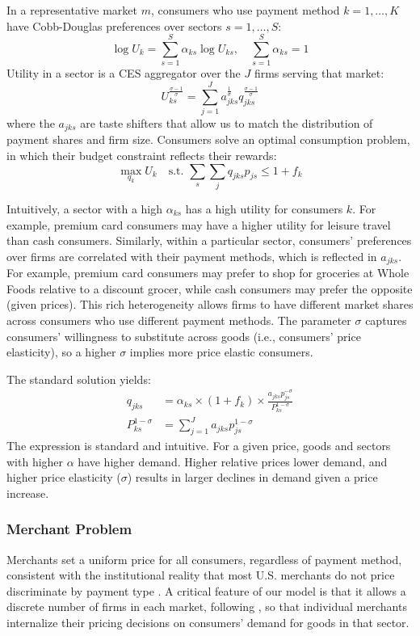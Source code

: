 \documentclass[11pt,english]{article}
\theoremstyle{remark}
\begin{document}
In a representative market $m$, consumers who use payment method $k=1,\dots,K$ have Cobb-Douglas preferences over sectors $s=1,\dots,S$:
\[
\log U_{k}=\sum_{s=1}^{S}\alpha_{ks}\log U_{ks},\quad\sum_{s=1}^{S}\alpha_{ks}=1
\]
Utility in a sector is a CES aggregator over the $J$ firms serving that market:
\[
U_{ks}^{\frac{\sigma-1}{\sigma}}=\sum_{j=1}^{J}a_{jks}^{\frac{1}{\sigma}}q_{jks}^{\frac{\sigma-1}{\sigma}}
\]
where the $a_{jks}$ are taste shifters that allow us to match the distribution of payment shares and firm size. Consumers solve an optimal consumption problem, in which their budget constraint reflects their rewards:
\begin{equation}
\max_{q_{k}}U_{k}\quad\text{s.t. }\sum_{s}\sum_{j}q_{jks}p_{js}\leq1+f_{k} 
\end{equation}

Intuitively, a sector with a high $\alpha_{ks}$ has a high utility for consumers $k$.
For example, premium card consumers may have a higher utility for leisure travel than cash consumers.
Similarly, within a particular sector, consumers' preferences over firms are correlated with their payment methods, which is reflected in $a_{jks}$.
For example, premium card consumers may prefer to shop for groceries at Whole Foods relative to a discount grocer, while cash consumers may prefer the opposite (given prices).
This rich heterogeneity allows firms to have different market shares across consumers who use different payment methods.
The parameter $\sigma$ captures consumers' willingness to substitute across goods (i.e., consumers' price elasticity), so a higher $\sigma$ implies more price elastic consumers. 

The standard solution yields:
\begin{align}
q_{jks} & =\alpha_{ks}\times\left(1+f_{k}\right)\times\frac{a_{jks}p_{js}^{-\sigma}}{P_{ks}^{1-\sigma}} \\ 
P_{ks}^{1-\sigma} & =\sum_{j=1}^{J}a_{jks}p_{js}^{1-\sigma}
\end{align}
The expression is standard and intuitive.
For a given price, goods and sectors with higher $\alpha$ have higher demand.
Higher relative prices lower demand, and higher price elasticity ($\sigma$) results in larger declines in demand given a price increase.

\subsubsection{Merchant Problem}

Merchants set a uniform price for all consumers, regardless of payment method, consistent with the institutional reality that most U.S. merchants do not price discriminate by payment type \citep{Stavins2018}.
A critical feature of our model is that it allows a discrete number of firms in each market, following \citet{Hottman.etal2016}, so that individual merchants internalize their pricing decisions on consumers' demand for goods in that sector.
\end{document}

